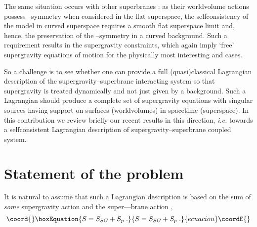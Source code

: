 \documentclass[a4paper,11pt]{article}
\begin{document}
The same situation occurs with other superbranes \cite{BST87,ST90}:  
as their worldvolume actions possess \myHighlight{$\kappa$}\coordHE{}--symmetry when considered 
in the flat superspace, the 
selfconsistency of the model in curved superspace requires a smooth 
flat superspace limit and, hence, the preservation of the 
\myHighlight{$\kappa$}\coordHE{}--symmetry in a curved background. Such a requirement results in 
the supergravity constraints, which again imply `free' supergravity 
equations of motion for 
the physically most interesting \coordHE{} and \coordHE{} cases.  

So a challenge is to see whether one can provide a full (quasi)classical 
Lagrangian description of the supergravity--superbrane interacting system 
so that supergravity is treated dynamically and not just given by a 
background. 
Such a Lagrangian should produce a complete set of 
supergravity equations with singular sources having support on 
surfaces (worldvolumes) in spacetime (superspace). 
In this contribution we review briefly 
our recent  results \cite{BAIL,BdAI1,BAIL4} 
in this direction, {\it i.e.} towards a selfconsistent Lagrangian 
description of supergravity--superbrane coupled system.


\section{Statement of the problem}

It is natural to assume that such a Lagrangian description 
is based on the sum of {\sl some} supergravity action  
\coordHE{} and the super--\coordHE{}--brane action \coordHE{}, 
\begin{equation}\coord{}\boxEquation{
  \label{S=S+S}
  S= S_{SG} + S_{p}  \; . 
}{
  S= S_{SG} + S_{p}  \; . 
}{ecuacion}\coordE{}\end{equation}
\end{document}
